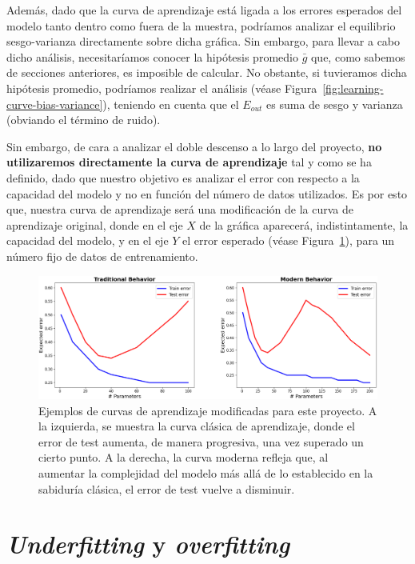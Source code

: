 Además, dado que la curva de aprendizaje está ligada a los errores esperados del modelo tanto dentro como fuera de la muestra, podríamos analizar el equilibrio sesgo-varianza directamente sobre dicha gráfica. Sin embargo, para llevar a cabo dicho análisis, necesitaríamos conocer la hipótesis promedio $\bar{g}$ que, como sabemos de secciones anteriores, es imposible de calcular. No obstante, si tuvieramos dicha hipótesis promedio, podríamos realizar el análisis (véase Figura~\ref{fig:learning-curve-bias-variance}), teniendo en cuenta que el $E_{out}$ es suma de sesgo y varianza (obviando el término de ruido).

Sin embargo, de cara a analizar el doble descenso a lo largo del proyecto, \textbf{no utilizaremos directamente la curva de aprendizaje} tal y como se ha definido, dado que nuestro objetivo es analizar el error con respecto a la capacidad del modelo y no en función del número de datos utilizados. Es por esto que, nuestra curva de aprendizaje será una modificación de la curva de aprendizaje original, donde en el eje $X$ de la gráfica aparecerá, indistintamente, la capacidad del modelo, y en el eje $Y$ el error esperado (véase Figura~\ref{fig:learning-curve-classicalvsmodern}), para un número fijo de datos de entrenamiento.

\begin{figure}[h]
    \centering
    \includegraphics[width=0.8\linewidth]{img/learning-curve-classicalvsmodern.png}
    \caption[Ejemplos de curvas de aprendizaje modificadas para este proyecto.] {Ejemplos de curvas de aprendizaje modificadas para este proyecto. A la izquierda, se muestra la curva clásica de aprendizaje, donde el error de test aumenta, de manera progresiva, una vez superado un cierto punto. A la derecha, la curva moderna refleja que, al aumentar la complejidad del modelo más allá de lo establecido en la sabiduría clásica, el error de test vuelve a disminuir.}\label{fig:learning-curve-classicalvsmodern}
\end{figure}

\section{\textit{Underfitting} y \textit{overfitting}}\label{sec:subsec-underfitting-y-overfitting}

